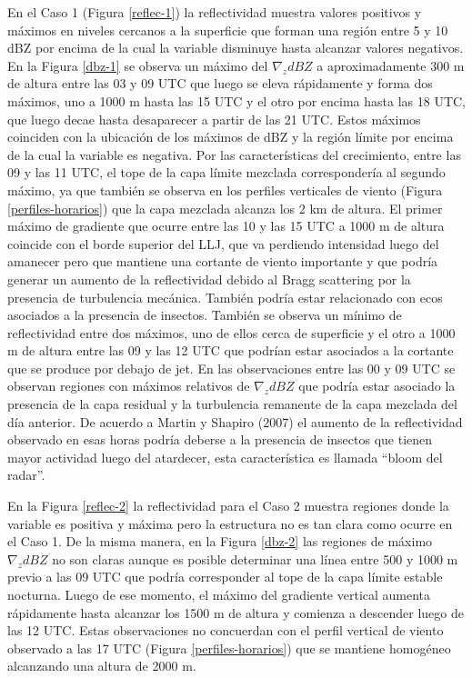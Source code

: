 \documentclass[12pt,spanish,oneside, a4paper]{book}
\begin{document}
En el Caso 1 (Figura \ref{reflec-1}) la reflectividad muestra valores
positivos y máximos en niveles cercanos a la superficie que forman una
región entre 5 y 10 dBZ por encima de la cual la variable disminuye
hasta alcanzar valores negativos. En la Figura \ref{dbz-1} se observa un
máximo del \(\nabla_z dBZ\) a aproximadamente 300 m de altura entre las
03 y 09 UTC que luego se eleva rápidamente y forma dos máximos, uno a
1000 m hasta las 15 UTC y el otro por encima hasta las 18 UTC, que luego
decae hasta desaparecer a partir de las 21 UTC. Estos máximos coinciden
con la ubicación de los máximos de dBZ y la región límite por encima de
la cual la variable es negativa. Por las características del
crecimiento, entre las 09 y las 11 UTC, el tope de la capa límite
mezclada correspondería al segundo máximo, ya que también se observa en
los perfiles verticales de viento (Figura \ref{perfiles-horarios}) que
la capa mezclada alcanza los 2 km de altura. El primer máximo de
gradiente que ocurre entre las 10 y las 15 UTC a 1000 m de altura
coincide con el borde superior del LLJ, que va perdiendo intensidad
luego del amanecer pero que mantiene una cortante de viento importante y
que podría generar un aumento de la reflectividad debido al Bragg
scattering por la presencia de turbulencia mecánica. También podría
estar relacionado con ecos asociados a la presencia de insectos. También
se observa un mínimo de reflectividad entre dos máximos, uno de ellos
cerca de superficie y el otro a 1000 m de altura entre las 09 y las 12
UTC que podrían estar asociados a la cortante que se produce por debajo
de jet. En las observaciones entre las 00 y 09 UTC se observan regiones
con máximos relativos de \(\nabla_z dBZ\) que podría estar asociado la
presencia de la capa residual y la turbulencia remanente de la capa
mezclada del día anterior. De acuerdo a Martin y Shapiro (2007) el
aumento de la reflectividad observado en esas horas podría deberse a la
presencia de insectos que tienen mayor actividad luego del atardecer,
esta característica es llamada ``bloom del radar''.

En la Figura \ref{reflec-2} la reflectividad para el Caso 2 muestra
regiones donde la variable es positiva y máxima pero la estructura no es
tan clara como ocurre en el Caso 1. De la misma manera, en la Figura
\ref{dbz-2} las regiones de máximo \(\nabla_z dBZ\) no son claras aunque
es posible determinar una línea entre 500 y 1000 m previo a las 09 UTC
que podría corresponder al tope de la capa límite estable nocturna.
Luego de ese momento, el máximo del gradiente vertical aumenta
rápidamente hasta alcanzar los 1500 m de altura y comienza a descender
luego de las 12 UTC. Estas observaciones no concuerdan con el perfil
vertical de viento observado a las 17 UTC (Figura
\ref{perfiles-horarios}) que se mantiene homogéneo alcanzando una altura
de 2000 m.
\end{document}
